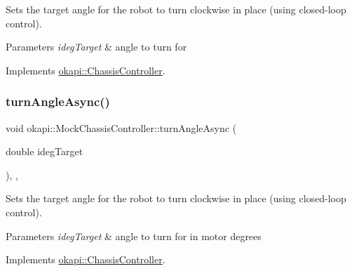 Sets the target angle for the robot to turn clockwise in place (using closed-\/loop control). 


\begin{DoxyParams}{Parameters}
{\em ideg\+Target} & angle to turn for \\
\hline
\end{DoxyParams}


Implements \mbox{\hyperlink{classokapi_1_1ChassisController_a87fc1f88bf06340d8f022a8c185b5e87}{okapi\+::\+Chassis\+Controller}}.

\mbox{\label{classokapi_1_1MockChassisController_a958241d32139ee7b709954e8d3d6cde1}} 
\subsubsection{\texorpdfstring{turnAngleAsync()}{turnAngleAsync()}\hspace{0.1cm}{\footnotesize\ttfamily [2/2]}}
{\footnotesize\ttfamily void okapi\+::\+Mock\+Chassis\+Controller\+::turn\+Angle\+Async (\begin{DoxyParamCaption}\item[{double}]{ideg\+Target }\end{DoxyParamCaption})\hspace{0.3cm}{\ttfamily [inline]}, {\ttfamily [override]}, {\ttfamily [virtual]}}



Sets the target angle for the robot to turn clockwise in place (using closed-\/loop control). 


\begin{DoxyParams}{Parameters}
{\em ideg\+Target} & angle to turn for in motor degrees \\
\hline
\end{DoxyParams}


Implements \mbox{\hyperlink{classokapi_1_1ChassisController_a35cadd99478629637b4bd3a5e709871a}{okapi\+::\+Chassis\+Controller}}.

\mbox{\label{classokapi_1_1MockChassisController_ae38ebe4f56aa14126103c9480214bfe7}} 
